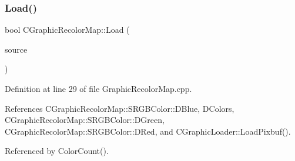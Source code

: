 \subsubsection{\texorpdfstring{Load()}{Load()}}
{\footnotesize\ttfamily bool C\+Graphic\+Recolor\+Map\+::\+Load (\begin{DoxyParamCaption}\item[{std\+::shared\+\_\+ptr$<$ \hyperlink{classCDataSource}{C\+Data\+Source} $>$}]{source }\end{DoxyParamCaption})}



Definition at line 29 of file Graphic\+Recolor\+Map.\+cpp.



References C\+Graphic\+Recolor\+Map\+::\+S\+R\+G\+B\+Color\+::\+D\+Blue, D\+Colors, C\+Graphic\+Recolor\+Map\+::\+S\+R\+G\+B\+Color\+::\+D\+Green, C\+Graphic\+Recolor\+Map\+::\+S\+R\+G\+B\+Color\+::\+D\+Red, and C\+Graphic\+Loader\+::\+Load\+Pixbuf().



Referenced by Color\+Count().


